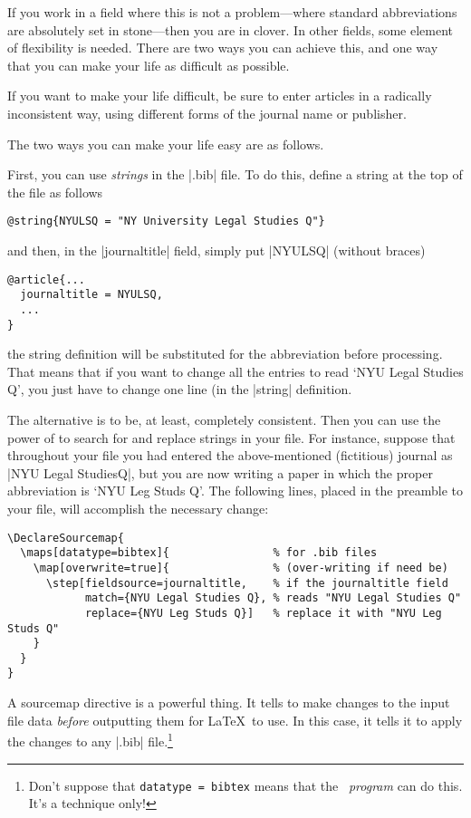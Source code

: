 If you work in a field where this is not a problem---where standard
abbreviations are absolutely set in stone---then you are in
clover. In other fields, some element of flexibility is needed. There
are two ways you can achieve this, and one way that you can make your
life as difficult as possible.

If you want to make your life difficult, be sure to enter articles in
a radically inconsistent way, using different forms of the journal
name or publisher.

The two ways you can make your life easy are as follows.

First, you can use \emph{strings} in the |.bib| file. To do this,
define a string at the top of the file as follows
\begin{Verbatim}
@string{NYULSQ = "NY University Legal Studies Q"}
\end{Verbatim}
and then, in the |journaltitle| field, simply put |NYULSQ| (without braces)
\begin{Verbatim}
@article{...
  journaltitle = NYULSQ,
  ...
}
\end{Verbatim}
the string definition will be substituted for the abbreviation before
processing. That means that if you want to change all the entries to
read `NYU Legal Studies Q', you just have to change one line (in the
|string| definition.

The alternative is to be, at least, completely consistent. Then you
can use the power of  to search for and replace strings
in your file. For instance, suppose that throughout your file you had
entered the above-mentioned (fictitious) journal as |NYU Legal StudiesQ|,
but you are now writing a paper in which the proper abbreviation
is `NYU Leg Studs Q'. The following lines, placed in the preamble to
your file, will accomplish the necessary change:\label{datamap}

\begin{Verbatim}
\DeclareSourcemap{
  \maps[datatype=bibtex]{                % for .bib files
    \map[overwrite=true]{                % (over-writing if need be)
      \step[fieldsource=journaltitle,    % if the journaltitle field
            match={NYU Legal Studies Q}, % reads "NYU Legal Studies Q"
            replace={NYU Leg Studs Q}]   % replace it with "NYU Leg Studs Q"
    }
  }
}
\end{Verbatim}

A sourcemap directive is a powerful thing. It tells  to make changes to the input
file data \emph{before} outputting them for \LaTeX\ to use. In this
case, it tells it to apply the changes to any |.bib|
file.\footnote{Don't suppose that \texttt{datatype = bibtex} means that
  the \bibtex\ \emph{program} can do this. It's a 
  technique only!}

